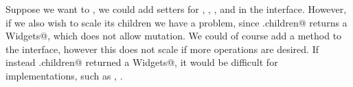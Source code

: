 Suppose we want to   \Q@Widget@{}, we could add \Q@mut@ setters for \Q@width@, \Q@height@, \Q@left@, and \Q@top@ in the \Q@Widget@ interface. However, if we also wish to scale its children we have a problem, since \Q@Widget.children@ returns a \Q@read Widgets@, which does not allow mutation. We could of course add a \Q@mut@ method \Q@zoom@ to the \Q@Widget@ interface, however this does not scale if more operations are desired. If instead \Q@Widget.children@ returned a \Q@mut Widgets@, it would be difficult for \Q@Widget@ implementations, such as \Q@SafeMovable@, 
 .


